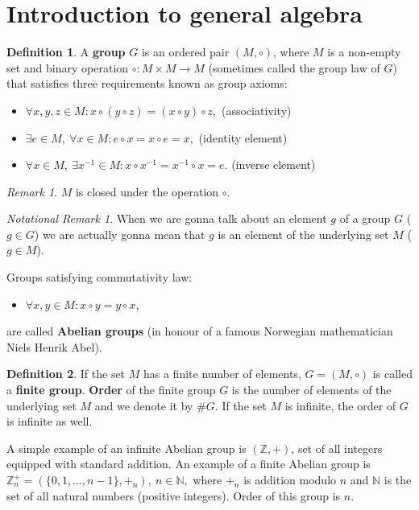\documentclass[thesis=M,english]{FITthesis}[2012/10/20]
\theoremstyle{remark}
\newtheorem*{RM}{Remark}
\newtheorem*{NRM}{Notational Remark}
\theoremstyle{definition}
\newtheorem{DF}{Definition}[section]
\begin{document}
\section{Introduction to general algebra}
\begin{DF}
A \textbf{group} $G$ is an ordered pair $(M,  \circ)$, where $M$ is a non-empty set and binary operation $\circ : M \times M \to M $ (sometimes called the group law of $G$) that satisfies three requirements known as group axioms: 
\end{DF}
\begin{itemize}
\item 
$ \forall x,y,z \in M: x\circ (y \circ z) = (x \circ y) \circ z,$ \hfill (associativity)
\item 
$ \exists e \in M,\ \forall x \in M: e \circ x = x \circ e = x,$ \hfill (identity element)
\item 
$\forall x \in M,\ \exists x^{-1} \in M: x \circ x^{-1} = x^{-1} \circ x = e.$ \hfill (inverse element)
\end{itemize}
\begin{RM}
$M$ is closed under the operation $\circ$. 
\end{RM}
\begin{NRM}
When we are gonna talk about an element  $g$ of a group $G$ ($g \in G$) we are actually gonna mean that $g$ is an element of the underlying set $M$ ($g \in M$).
\end{NRM}
Groups satisfying commutativity law:
\begin{itemize}
\item 
$ \forall x, y\in M: x \circ y = y \circ x,$
\end{itemize}
are called \textbf{Abelian groups} (in honour of a famous Norwegian mathematician Niels Henrik Abel). 
\begin{DF}
If the set $M$ has a finite number of elements, $G = (M, \circ)$ is called a \textbf{finite group}. \textbf{Order} of the finite group $G$ is the number of elements of the underlying set $M$ and we denote it by $\#G$. If the set $M$ is infinite, the order of $G$ is infinite as well.
\end{DF}
\noindent A simple example of an infinite Abelian group is $(\mathbb{Z}, +)$, set of all integers equipped with standard addition. An example of a finite Abelian group is $\mathbb{Z}_n^+ = (\{0, 1, \ldots, n-1\}, +_{n}),\ n \in \mathbb{N},$ where $+_n$ is addition modulo $n$ and $\mathbb{N}$ is the set of all natural numbers (positive integers). Order of this group is $n$.
\end{document}
